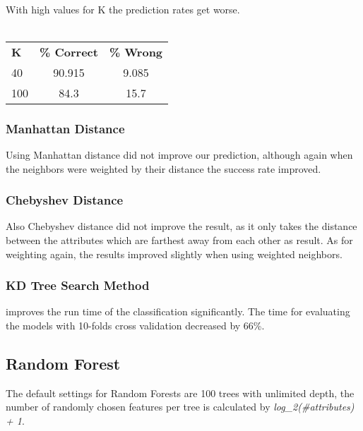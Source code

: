 \documentclass{sig-alternate-05-2015}
\begin{document}
{\paragraph{}With high values for K the prediction rates get worse. 
\\\\
\begin{center}
\begin{tabular}{ l | c | c }
\textbf{K} & \textbf{\% Correct} & \textbf{\% Wrong} \\
40 & 90.915 & 9.085 \\
100 &  84.3 & 15.7 \\
\end{tabular}
\end{center}
\subsubsection{Manhattan Distance} Using Manhattan distance did not improve our prediction, although again when the neighbors were weighted by their distance the success rate improved.
\subsubsection{Chebyshev Distance} Also Chebyshev distance did not improve the result, as it only takes the distance between the attributes which are farthest away from each other as result. As for weighting again, the results improved slightly when using weighted neighbors.
\subsubsection{KD Tree Search Method} improves the run time of the classification significantly. The time for evaluating the models with 10-folds cross validation decreased by 66\%. 

\subsection{Random Forest}
The default settings for Random Forests are 100 trees with unlimited depth, the number of randomly chosen features per tree is calculated by \textit{log\_2(\#attributes) + 1}.
}
\end{document}

